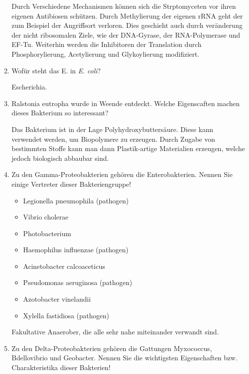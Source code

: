 \begin{enumerate}
		Durch Verschiedene Mechanismen können sich die Strptomyceten vor ihren eigenen Antibiosen schützen.
		Durch Methylierung der eigenen rRNA geht der zum Beispiel der Angriffsort verloren.
		Dies geschieht auch durch veränderung der nicht ribosomalen Ziele,
		wie der DNA-Gyrase, der RNA-Polymerase und EF-Tu. %
		Weiterhin werden die Inhibitoren der Translation durch Phosphorylierung,
		Acetylierung und Glykoylierung modifiziert.

	\item Wofür steht das E. in \emph{E. coli}? 

		Escherichia.

	\item Ralstonia eutropha wurde in Weende entdeckt. Welche Eigenscaften machen dieses Bakterium so interessant?
		
		Das Bakterium ist in der Lage Polyhydroxybuttersäure.
		Diese kann verwendet werden,
		um Biopolymere zu erzeugen.
		Durch Zugabe von bestimmten Stoffe kann man dann Plastik-artige Materialien erzeugen,
		welche jedoch biologisch abbaubar sind.

	\item Zu den Gamma-Proteobakterien gehören die Enterobakterien. Nennen Sie einige Vertreter dieser Bakteriengruppe!
	
		\begin{itemize}
			\item Legionella pneumophila	\hfill (pathogen)
			\item Vibrio cholerae
			\item Photobacterium
			\item Haemophilus influenzae 	\hfill (pathogen)
			\item Acinetobacter calcoaceticus
			\item	Pseudomonas aeruginosa 	\hfill (pathogen)
			\item Azotobacter vinelandii
			\item	Xylella fastidiosa 	\hfill (pathogen)

		\end{itemize}

		Fakultative Anaerober, die alle sehr nahe miteinander verwandt sind.

	\item Zu den Delta-Proteobakterien gehören die Gattungen Myxococcus, Bdellovibrio und Geobacter. Nennen Sie die wichtigsten Eigenschaften bzw. Charakteristika dieser Bakterien!
		

\end{enumerate}

